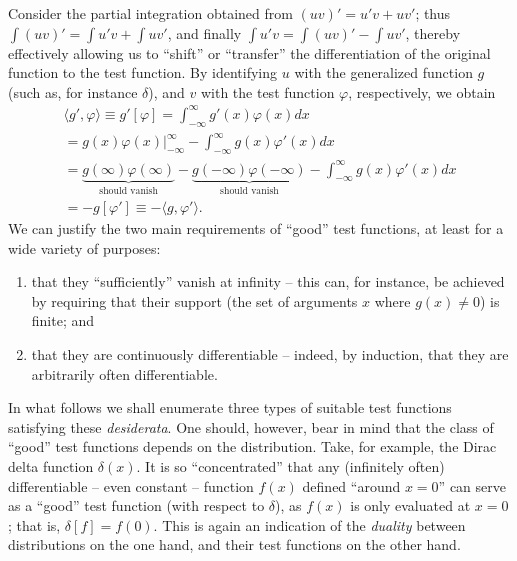 Consider the partial integration
obtained from $(uv)' = u'v+uv'$; thus
$\int (uv)' = \int u'v+\int uv'$,
and finally   $\int u'v = \int (uv)'  -\int uv'$,
thereby effectively allowing us to ``shift'' or ``transfer''
the differentiation of the original function to the test function.
By identifying $u$ with the generalized function $g$ (such as, for instance  $\delta$),
and $v$ with the test function $\varphi$, respectively, we obtain
\begin{equation}
\begin{split}
\langle g' ,    \varphi  \rangle
\equiv
g'[\varphi] =
\int_{-\infty}^\infty
g'(x)\varphi(x)
dx      \\
=
\left.
g(x)\varphi(x)\right|_{-\infty}^\infty
-  \int_{-\infty}^\infty
g(x)\varphi'(x)
dx           \\
=
\underbrace{g(\infty)\varphi(\infty)}_{\textrm{should vanish}} - \underbrace{g(-\infty)\varphi(-\infty)}_{\textrm{should vanish}}
-  \int_{-\infty}^\infty
g(x)\varphi'(x)
dx  \\
= - g[\varphi'] \equiv   -   \langle g ,    \varphi'  \rangle
.
\end{split}
\label{2012-m-ch-di-desiderata}
\end{equation}
We can justify the two main requirements of ``good'' test functions, at least for a wide variety of purposes:
\begin{enumerate}
\item
that they ``sufficiently'' vanish at infinity -- this can, for instance, be achieved by requiring that their support
(the set of arguments $x$ where $g(x)\neq 0$) is finite; and
\item
that they are continuously differentiable -- indeed, by induction, that they are arbitrarily often differentiable.
\end{enumerate}

In what follows we shall enumerate three types of suitable test functions satisfying these {\it desiderata}.
One should, however, bear in mind that the class of ``good'' test functions depends on the distribution.
Take, for example, the Dirac delta function $\delta (x)$. It is so ``concentrated'' that any (infinitely often)
differentiable -- even constant -- function $f(x)$ defined ``around $x=0$''
can serve as a ``good'' test function (with respect to $\delta$),
as $f(x)$ is only evaluated at $x=0$; that is, $\delta[f]=f(0)$.
This is again an indication of the {\em duality} between distributions on the one hand,
and their test functions on the other hand.

